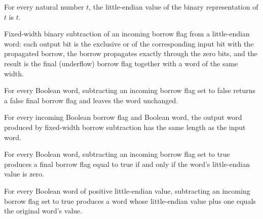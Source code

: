 \begin{lemma}
\label{Turing.timedValue_bits}
\leanok
{}
For every natural number $t$, the little-endian value of the binary representation of
$t$ is $t$.
\end{lemma}

\begin{definition}
\label{Turing.timedBorrow}
\leanok
Fixed-width binary subtraction of an incoming borrow flag from a little-endian
word: each output bit is the exclusive or of the corresponding input bit with
the propagated borrow, the borrow propagates exactly through the zero bits,
and the result is the final (underflow) borrow flag together with a word of
the same width.
\end{definition}

\begin{lemma}
\label{Turing.timedBorrow_false}
\leanok
{}
For every Boolean word, subtracting an incoming borrow flag set to false returns a false
final borrow flag and leaves the word unchanged.
\end{lemma}

\begin{lemma}
\label{Turing.timedBorrow_length}
\leanok
{}
For every incoming Boolean borrow flag and Boolean word, the output word produced by
fixed-width borrow subtraction has the same length as the input word.
\end{lemma}

\begin{lemma}
\label{Turing.timedBorrow_underflow}
\leanok
{}
For every Boolean word, subtracting an incoming borrow flag set to true produces a final
borrow flag equal to true if and only if the word's little-endian value is zero.
\end{lemma}

\begin{lemma}
\label{Turing.timedBorrow_value}
\leanok
{}
For every Boolean word of positive little-endian value, subtracting an incoming borrow
flag set to true produces a word whose little-endian value plus one equals the original
word's value.
\end{lemma}

